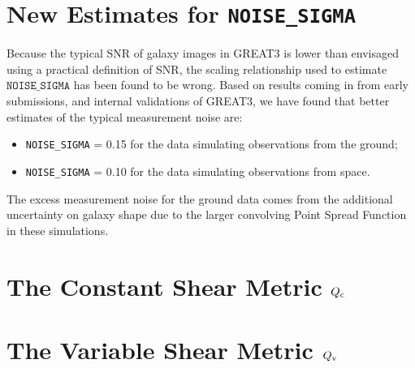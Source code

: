 \documentclass[preprint,11pt]{aastex}
\begin{document}
\section{New Estimates for \texttt{NOISE\_SIGMA}}
Because the typical SNR of galaxy images in GREAT3 is lower than
envisaged using a practical definition of SNR, the scaling
relationship used to estimate $\texttt{NOISE\_SIGMA}$ has been found
to be wrong.   Based on results coming in from early submissions, and
internal validations of GREAT3, we have found that better estimates of
the typical measurement noise are:
\begin{itemize}
\item[] \texttt{NOISE\_SIGMA} = 0.15 for the data simulating
  observations from the ground;
\item[] \texttt{NOISE\_SIGMA} = 0.10 for the data simulating
  observations from space.
\end{itemize}
The excess measurement noise for the ground data comes from the
additional uncertainty on galaxy shape due to the larger convolving
Point Spread Function in these simulations.

\section{The Constant Shear Metric $Q_{\rm c}$}\label{sec:qc}


\section{The Variable Shear Metric $Q_{\rm v}$}\label{sec:qv}
\end{document}
